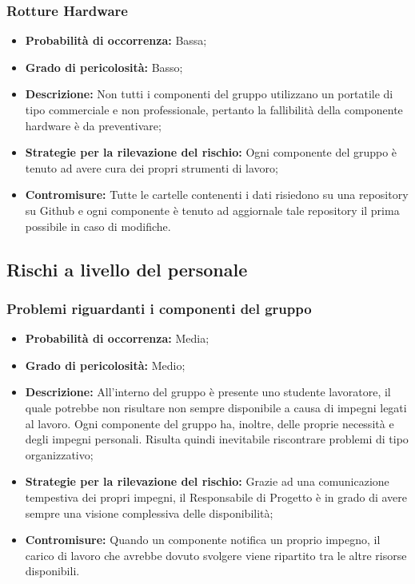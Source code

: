 		\subsubsection{Rotture Hardware}
		\begin{itemize}
			\item \textbf{Probabilità di occorrenza:} Bassa; \\
			\item \textbf{Grado di pericolosità:} Basso; \\
			\item \textbf{Descrizione:} Non tutti i componenti del gruppo utilizzano un portatile di tipo commerciale e non professionale, pertanto la fallibilità della componente hardware è da preventivare; \\
			\item \textbf{Strategie per la rilevazione del rischio:} Ogni componente del gruppo è tenuto ad avere cura dei propri strumenti di lavoro; \\
			\item \textbf{Contromisure:} Tutte le cartelle contenenti i dati risiedono su una repository su Github e ogni componente è tenuto ad aggiornale tale repository il prima possibile in caso di modifiche. \\
		\end{itemize}
	\subsection{Rischi a livello del personale}
		\subsubsection{Problemi riguardanti i componenti del gruppo}
		\begin{itemize}
			\item \textbf{Probabilità di occorrenza:} Media; \\
			\item \textbf{Grado di pericolosità:} Medio; \\
			\item \textbf{Descrizione:} All'interno del gruppo è presente uno studente lavoratore, il quale potrebbe non risultare non sempre disponibile a causa di impegni legati al lavoro. Ogni componente del gruppo ha, inoltre, delle proprie necessità e degli impegni personali. Risulta quindi inevitabile riscontrare problemi di tipo organizzativo; \\
			\item \textbf{Strategie per la rilevazione del rischio:} Grazie ad una comunicazione tempestiva dei propri impegni, il Responsabile di Progetto è in grado di avere sempre una visione complessiva delle disponibilità; \\
			\item \textbf{Contromisure:} Quando un componente notifica un proprio impegno, il carico di lavoro che avrebbe dovuto svolgere viene ripartito tra le altre risorse disponibili. \\
		\end{itemize}
